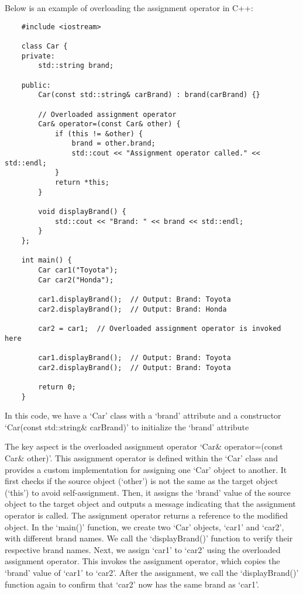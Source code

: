 \begin{solution}
    Below is an example of overloading the assignment operator in C++:
    
    \horizontalline
    
    \begin{verbatim}   
    #include <iostream>

    class Car {
    private:
        std::string brand;
    
    public:
        Car(const std::string& carBrand) : brand(carBrand) {}
    
        // Overloaded assignment operator
        Car& operator=(const Car& other) {
            if (this != &other) {
                brand = other.brand;
                std::cout << "Assignment operator called." << std::endl;
            }
            return *this;
        }
    
        void displayBrand() {
            std::cout << "Brand: " << brand << std::endl;
        }
    };
    
    int main() {
        Car car1("Toyota");
        Car car2("Honda");
    
        car1.displayBrand();  // Output: Brand: Toyota
        car2.displayBrand();  // Output: Brand: Honda
    
        car2 = car1;  // Overloaded assignment operator is invoked here
    
        car1.displayBrand();  // Output: Brand: Toyota
        car2.displayBrand();  // Output: Brand: Toyota
    
        return 0;
    }
        \end{verbatim}
    
    \horizontalline
    
    In this code, we have a `Car' class with a `brand' attribute and a constructor `Car(const std::string\& carBrand)' to initialize the `brand' attribute
    
    The key aspect is the overloaded assignment operator `Car\& operator=(const Car\& other)'. This assignment operator is defined within the `Car' class and provides a custom implementation for assigning one `Car' object to another. It first checks if the source object 
    (`other') is not the same as the target object (`this') to avoid self-assignment. Then, it assigns the `brand' value of the source object to the target object and outputs a message indicating that the assignment operator is called. The assignment operator returns a 
    reference to the modified object. In the `main()' function, we create two `Car' objects, `car1' and `car2', with different brand names. We call the `displayBrand()' function to verify their respective brand names. Next, we assign `car1' to `car2' using the overloaded 
    assignment operator. This invokes the assignment operator, which copies the `brand' value of `car1' to `car2'. After the assignment, we call the `displayBrand()' function again to confirm that `car2' now has the same brand as `car1'.
    

\end{solution}
